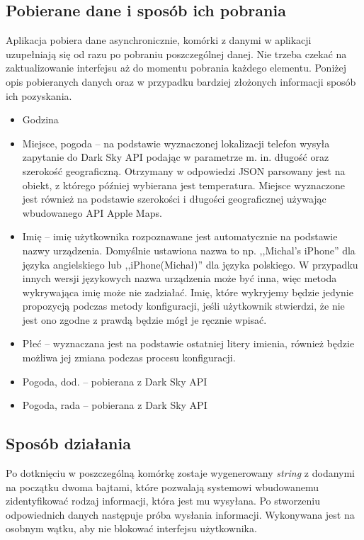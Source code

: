 \documentclass[a4paper,11pt]{article}
\begin{document}
\subsection{Pobierane dane i sposób ich pobrania}
Aplikacja pobiera dane asynchronicznie, komórki z danymi w aplikacji uzupełniają się od razu po pobraniu poszczególnej danej. Nie trzeba czekać na zaktualizowanie interfejsu aż do momentu pobrania każdego elementu. Poniżej opis pobieranych danych oraz w przypadku bardziej złożonych informacji sposób ich pozyskania.

\begin{itemize}
	\item Godzina
	\item Miejsce, pogoda -- na podstawie wyznaczonej lokalizacji telefon wysyła zapytanie do Dark Sky API podając w parametrze m. in. długość oraz szerokość geograficzną. Otrzymany w odpowiedzi JSON parsowany jest na obiekt, z którego później wybierana jest temperatura. Miejsce wyznaczone jest również na podstawie szerokości i długości geograficznej używając wbudowanego  API Apple Maps.
	\item Imię -- imię użytkownika rozpoznawane jest automatycznie na podstawie nazwy urządzenia. Domyślnie ustawiona nazwa to np. ,,Michal's iPhone'' dla języka angielskiego lub ,,iPhone(Michał)'' dla języka polskiego. W przypadku innych wersji językowych nazwa urządzenia może być inna, więc metoda wykrywająca imię może nie zadziałać. Imię, które wykryjemy będzie jedynie propozycją podczas metody konfiguracji, jeśli użytkownik stwierdzi, że nie jest ono zgodne z prawdą będzie mógł je ręcznie wpisać.
	\item Płeć -- wyznaczana jest na podstawie ostatniej litery imienia, również będzie możliwa jej zmiana podczas procesu konfiguracji.
	\item Pogoda, dod. -- pobierana z Dark Sky API
	\item Pogoda, rada -- pobierana z Dark Sky API
\end{itemize}

\subsection{Sposób działania}
Po dotknięciu w poszczególną komórkę zostaje wygenerowany \textit{string} z dodanymi na początku dwoma bajtami, które pozwalają systemowi wbudowanemu zidentyfikować rodzaj informacji, która jest mu wysyłana. Po stworzeniu odpowiednich danych następuje próba wysłania informacji. Wykonywana jest na osobnym wątku, aby nie blokować interfejsu użytkownika.
\end{document}
